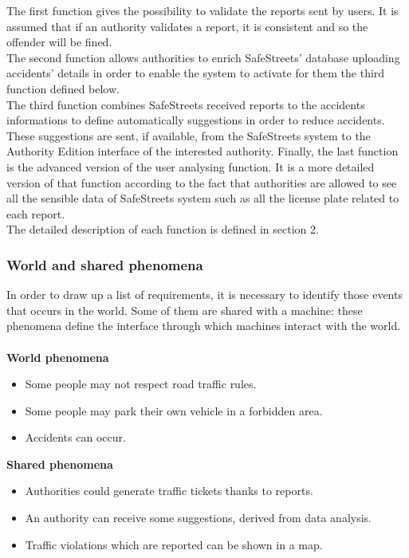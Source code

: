 \documentclass{article}
\begin{document}
    	    The first function gives the possibility to validate the reports sent by users. It is assumed that if an authority validates a report, it is consistent and so the offender will be fined.\\
    	    The second function allows authorities to enrich SafeStreets' database uploading accidents' details in order to enable the system to activate for them the third function defined below.\\
    	    The third function combines SafeStreets received reports to the accidents informations to define automatically suggestions in order to reduce accidents. These suggestions are sent, if available, from the SafeStreets system to the Authority Edition interface of the interested authority.
    	    Finally, the last function is the advanced version of the user analysing function. It is a more detailed version of that function according to the fact that authorities are allowed to see all the sensible data of SafeStreets system such as all the license plate related to each report.\\
    		The detailed description of each function is defined in section 2.
    	    
			\subsubsection{World and shared phenomena}
				In order to draw up a list of requirements, it is necessary to identify those events that occurs in the world. Some of them are shared with a machine: these phenomena define the interface through which machines interact with the world.\\\\				
				\textbf{World phenomena}
				\begin{itemize}
					\item Some people may not respect road traffic rules.
					\item Some people may park their own vehicle in a forbidden area.
					\item Accidents can occur.
				\end{itemize}
				\textbf{Shared phenomena}
				\begin{itemize}
					\item Authorities could generate traffic tickets thanks to reports. 
					\item An authority can receive some suggestions, derived from data analysis.
					\item Traffic violations which are reported can be shown in a map.
				\end{itemize}
\end{document}
